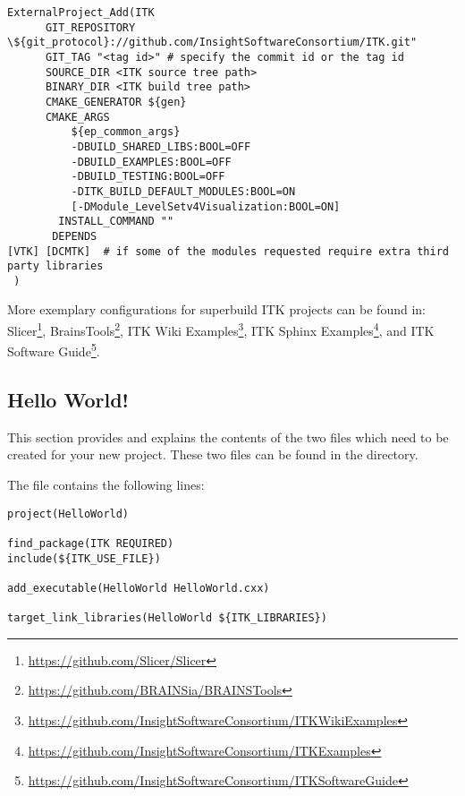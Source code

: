 \small
\begin{verbatim}
ExternalProject_Add(ITK
      GIT_REPOSITORY \${git_protocol}://github.com/InsightSoftwareConsortium/ITK.git"
      GIT_TAG "<tag id>" # specify the commit id or the tag id
      SOURCE_DIR <ITK source tree path>
      BINARY_DIR <ITK build tree path>
      CMAKE_GENERATOR ${gen}
      CMAKE_ARGS
          ${ep_common_args}
          -DBUILD_SHARED_LIBS:BOOL=OFF
          -DBUILD_EXAMPLES:BOOL=OFF
          -DBUILD_TESTING:BOOL=OFF
          -DITK_BUILD_DEFAULT_MODULES:BOOL=ON
          [-DModule_LevelSetv4Visualization:BOOL=ON]
        INSTALL_COMMAND ""
       DEPENDS
[VTK] [DCMTK]  # if some of the modules requested require extra third party libraries
 )
\end{verbatim}
\normalsize

More exemplary configurations for superbuild ITK projects can be found in:
Slicer\footnote{\url{https://github.com/Slicer/Slicer}},
BrainsTools\footnote{\url{https://github.com/BRAINSia/BRAINSTools}}, ITK Wiki
Examples\footnote{\url{https://github.com/InsightSoftwareConsortium/ITKWikiExamples}},
ITK Sphinx
Examples\footnote{\url{https://github.com/InsightSoftwareConsortium/ITKExamples}},
and ITK Software
Guide\footnote{\url{https://github.com/InsightSoftwareConsortium/ITKSoftwareGuide}}.

\subsection{Hello World!}
\label{sec:HelloWorldITK}


This section provides and explains the contents of the two files which need to
be created for your new project. These two files can be found in the
 directory.

The  file contains the following lines:

\begin{verbatim}
project(HelloWorld)

find_package(ITK REQUIRED)
include(${ITK_USE_FILE})

add_executable(HelloWorld HelloWorld.cxx)

target_link_libraries(HelloWorld ${ITK_LIBRARIES})
\end{verbatim}

